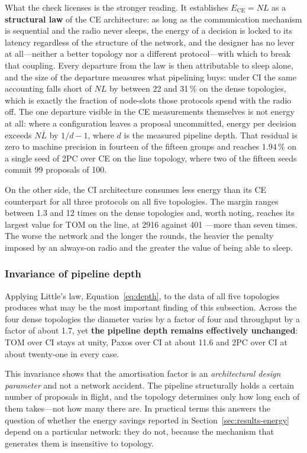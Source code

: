 \documentclass[journal]{IEEEtran}
\newcommand{\CI}{CI}                      %
\newcommand{\CE}{CE}                      %
\newcommand{\Nnodes}{N}                   %
\newcommand{\Ece}{E_{\mathrm{CE}}}        %
\begin{document}
What the check licenses is the stronger reading. It establishes
$\Ece = \Nnodes L$ as a \textbf{structural law} of the \CE{} architecture: as
long as the communication mechanism is sequential and the radio never sleeps,
the energy of a decision is locked to its latency regardless of the structure
of the network, and the designer has no lever at all---neither a better
topology nor a different protocol---with which to break that coupling. Every
departure from the law is then attributable to sleep alone, and the size of the
departure measures what pipelining buys: under \CI{} the same accounting
falls short of $\Nnodes L$ by between 22 and 31\,\% on the dense topologies,
which is exactly the fraction of node-slots those protocols spend with the
radio off. The one departure visible in the \CE{} measurements themselves is
not energy at all: where a configuration leaves a proposal uncommitted, energy
per decision exceeds $\Nnodes \bar{L}$ by $1/d - 1$, where $d$ is the measured
pipeline depth. That residual is zero to machine precision in fourteen of the
fifteen groups and reaches $1.94\,\%$ on a single seed of 2PC over \CE{} on the
line topology, where two of the fifteen seeds commit 99 proposals of 100.

On the other side, the \CI{} architecture consumes less energy than its
\CE{} counterpart for all three protocols on all five topologies. The
margin ranges between 1.3 and 12 times on the dense topologies and, worth
noting, reaches its largest value for TOM on the line, at 2916 against 401
---more than seven times. The worse the network and the longer the rounds,
the heavier the penalty imposed by an always-on radio and the greater the
value of being able to sleep.

\subsubsection{Invariance of pipeline depth}

Applying Little's law, Equation~\eqref{eq:depth}, to the data of all five
topologies produces what may be the most important finding of this
subsection. Across the four dense topologies the diameter varies by a
factor of four and throughput by a factor of about 1.7, yet
\textbf{the pipeline depth remains effectively unchanged}: TOM over \CI{}
stays at unity, Paxos over \CI{} at about 11.6 and 2PC over \CI{} at about
twenty-one in every case.

This invariance shows that the amortisation factor is an
\emph{architectural design parameter} and not a network accident. The
pipeline structurally holds a certain number of proposals in flight, and
the topology determines only how long each of them takes---not how many
there are. In practical terms this answers the question of whether the
energy savings reported in Section~\ref{sec:results-energy} depend on a
particular network: they do not, because the mechanism that generates them
is insensitive to topology.
\end{document}
